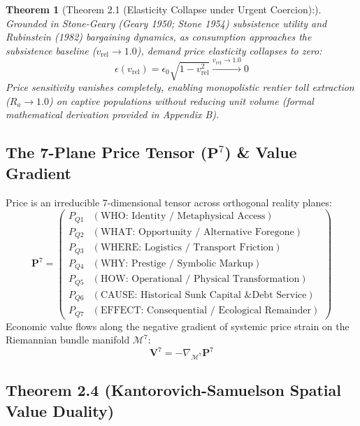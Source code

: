 \documentclass[preprint,12pt,authoryear]{elsarticle}
\newtheorem{theorem}{Theorem}
\theoremstyle{definition}
\begin{document}
  

\begin{theorem}[Theorem 2.1 (Elasticity Collapse under Urgent Coercion):] Grounded in Stone-Geary (Geary 1950; Stone 1954) subsistence utility and Rubinstein (1982) bargaining dynamics, as consumption approaches the subsistence baseline ($v_{\text{rel}} \to 1.0$), demand price elasticity collapses to zero:  
$$\epsilon(v_{\text{rel}}) = \epsilon_0 \sqrt{1 - v_{\text{rel}}^2} \xrightarrow{v_{\text{rel}} \to 1.0} 0$$  
Price sensitivity vanishes completely, enabling monopolistic rentier toll extraction ($R_a \to 1.0$) on captive populations without reducing unit volume (formal mathematical derivation provided in Appendix B).
\end{theorem}

\subsection{The 7-Plane Price Tensor ($\mathbf{P}^7$) \& Value Gradient}

Price is an irreducible 7-dimensional tensor across orthogonal reality planes:  
$$\mathbf{P}^7 = \begin{pmatrix} P_{Q1} & (\text{WHO: Identity / Metaphysical Access}) \\ P_{Q2} & (\text{WHAT: Opportunity / Alternative Foregone}) \\ P_{Q3} & (\text{WHERE: Logistics / Transport Friction}) \\ P_{Q4} & (\text{WHY: Prestige / Symbolic Markup}) \\ P_{Q5} & (\text{HOW: Operational / Physical Transformation}) \\ P_{Q6} & (\text{CAUSE: Historical Sunk Capital \& Debt Service}) \\ P_{Q7} & (\text{EFFECT: Consequential / Ecological Remainder}) \end{pmatrix}$$  
Economic value flows along the negative gradient of systemic price strain on the Riemannian bundle manifold $\mathcal{M}^7$:  
$$\mathbf{V}^7 = -\nabla_{\mathcal{M}^7} \mathbf{P}^7$$

\subsection{Theorem 2.4 (Kantorovich-Samuelson Spatial Value Duality)}
\end{document}
